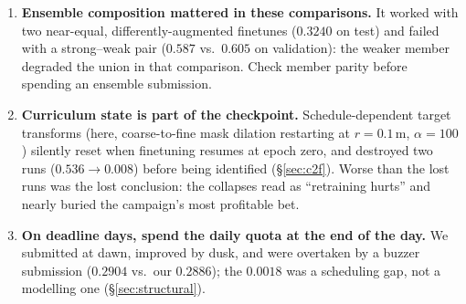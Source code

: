 \documentclass[11pt]{article}
\begin{document}
\begin{enumerate}
\item \textbf{Ensemble composition mattered in these comparisons.} It worked
  with two near-equal, differently-augmented finetunes ($0.3240$ on test)
  and failed with a strong--weak pair ($0.587$ vs.\ $0.605$ on validation):
  the weaker member degraded the union in that comparison. Check member parity
  before spending an ensemble submission.
\item \textbf{Curriculum state is part of the checkpoint.}
  Schedule-dependent target transforms (here, coarse-to-fine mask dilation
  restarting at $r=0.1$\,m, $\alpha=100$) silently reset when finetuning
  resumes at epoch zero, and destroyed two runs ($0.536 \to 0.008$) before
  being identified (\S\ref{sec:c2f}). Worse than the lost runs was the lost
  conclusion: the collapses read as ``retraining hurts'' and nearly buried
  the campaign's most profitable bet.
\item \textbf{On deadline days, spend the daily quota at the end of the
  day.} We submitted at dawn, improved by dusk, and were overtaken by a
  buzzer submission ($0.2904$ vs.\ our $0.2886$); the $0.0018$ was a
  scheduling gap, not a modelling one (\S\ref{sec:structural}).
\end{enumerate}




\end{document}
